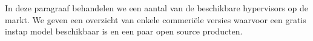 In deze paragraaf behandelen we een aantal van de beschikbare hypervisors op de markt. We geven een overzicht van enkele commeri\"ele versies waarvoor een gratis instap model beschikbaar is en een paar open source producten.
